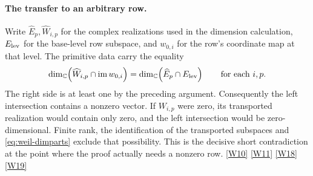 \documentclass[12pt,letterpaper]{article}
\begin{document}
\paragraph{The transfer to an arbitrary row.}
Write \(\widehat E_p,\widehat W_{i,p}\) for the complex realizations used in the dimension calculation, \(E_{\rm lev}\) for the base-level row subspace, and \(w_{0,i}\) for the row's coordinate map at that level. The primitive data carry the equality
\begin{equation}
  \dim_{\mathbb C}\!\left(\widehat W_{i,p}\cap
               \operatorname{im}w_{0,i}\right)
   =\dim_{\mathbb C}\!\left(\widehat E_p\cap E_{\rm lev}\right)
   \qquad\text{for each }i,p.
 \label{eq:weil-dimparts}
\end{equation}
The right side is at least one by the preceding argument. Consequently the left intersection contains a nonzero vector. If \(W_{i,p}\) were zero, its transported realization would contain only zero, and the left intersection would be zero-dimensional. Finite rank, the identification of the transported subspaces and \eqref{eq:weil-dimparts} exclude that possibility. This is the decisive short contradiction at the point where the proof actually needs a nonzero row. \href{https://github.com/nousentllc/riemann-hypothesis/blob/40e56bab026552e089d7afcfeff08d2defb9c005/src/Formalism/LocalToGlobal/IndefiniteReal/ZeroPartEigenvalueConvention.lean#L103-L213}{\textsf{[W10]}} \href{https://github.com/nousentllc/riemann-hypothesis/blob/40e56bab026552e089d7afcfeff08d2defb9c005/src/Development/AbelianVarietyTheory/Proofs/IwasawaDecomposition/RowPartFormsAndNonzeroVectorsEveryPlace.lean#L16-L32}{\textsf{[W11]}} \href{https://github.com/nousentllc/riemann-hypothesis/blob/40e56bab026552e089d7afcfeff08d2defb9c005/src/Formalism/LocalToGlobal/IndefiniteReal/CutTuples2.lean#L103-L142}{\textsf{[W18]}} \href{https://github.com/nousentllc/riemann-hypothesis/blob/40e56bab026552e089d7afcfeff08d2defb9c005/src/Formalism/LocalToGlobal/IndefiniteReal/BaseLiftsPackageOfPrimitiveLinks.lean#L199-L222}{\textsf{[W19]}}
\end{document}

